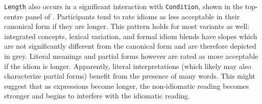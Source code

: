 \documentclass[output=paper
,modfonts
,nonflat]{langsci/langscibook}
\begin{document}
\texttt{Length} also occurs in a significant interaction with \texttt{Condition}, shown in the top-centre panel of . Participants tend to rate idioms as less acceptable in their canonical form if they are longer. This pattern holds for most variants as well: integrated concepts, lexical variation, and formal idiom blends have slopes which are not significantly different from the canonical form and are therefore depicted in grey. Literal meanings and partial forms however are rated as more acceptable if the idiom is longer. Apparently, literal interpretations (which likely may also characterize partial forms) benefit from the presence of many words. This might suggest that as expressions become longer, the non-idiomatic reading becomes stronger and begins to interfere with the idiomatic reading.\\
\end{document}
